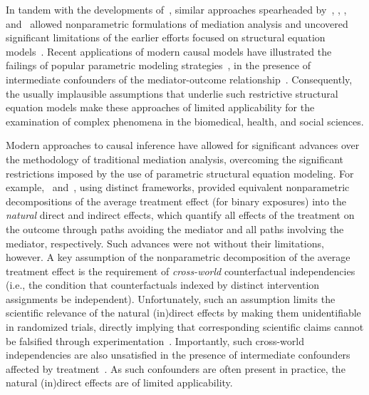 In tandem with the developments of~\citet{pearl2009causality}, similar
approaches spearheaded by~\citet{robins1986new}, \citet{spirtes2000causation},
\citet{dawid2000causal}, and~\cite{richardson2013single} allowed nonparametric
formulations of mediation analysis and uncovered significant limitations of the
earlier efforts focused on structural equation models~\citep{pearl1998graphs,
imai2010general}. Recent applications of modern causal models have illustrated
the failings of popular parametric modeling
strategies~\citep[i.e.,][]{baron1986moderator}, in the presence of intermediate
confounders of the mediator-outcome relationship~\citep{cole2002fallibility}.
Consequently, the usually implausible assumptions that underlie such restrictive
structural equation models make these approaches of limited applicability for
the examination of complex phenomena in the biomedical, health, and social
sciences.

Modern approaches to causal inference have allowed for significant advances over
the methodology of traditional mediation analysis, overcoming the significant
restrictions imposed by the use of parametric structural equation modeling. For
example,~\citet{robins1992identifiability} and~\citet{pearl2001direct}, using
distinct frameworks, provided equivalent nonparametric decompositions of the
average treatment effect (for binary exposures) into the \textit{natural}
direct and indirect effects, which quantify all effects of the treatment on the
outcome through paths avoiding the mediator and all paths involving the
mediator, respectively. Such advances were not without their limitations,
however. A key assumption of the nonparametric decomposition of the average
treatment effect is the requirement of \textit{cross-world} counterfactual
independencies (i.e., the condition that counterfactuals indexed by distinct
intervention assignments be independent). Unfortunately, such an assumption
limits the scientific relevance of the natural (in)direct effects by making them
unidentifiable in randomized trials, directly implying that corresponding
scientific claims cannot be falsified through
experimentation~\citep{popper1934logic, dawid2000causal, robins2010alternative}.
Importantly, such cross-world independencies are also unsatisfied in the
presence of intermediate confounders affected by
treatment~\citep{avin2005identifiability, tchetgen2014identification}. As such
confounders are often present in practice, the natural (in)direct effects are
of limited applicability.

